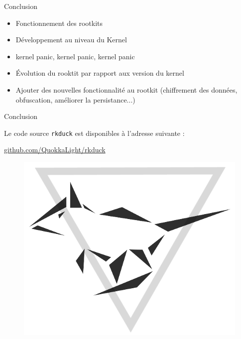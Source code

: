 \documentclass[10pt]{beamer}
\begin{document}
\begin{frame}{Conclusion}
	
	\begin{itemize}
		\item Fonctionnement des rootkits
		\item Développement au niveau du Kernel
		\item kernel panic, kernel panic, kernel panic
		\item Évolution du rooktit par rapport aux version du kernel
		\item Ajouter des nouvelles fonctionnalité au rootkit (chiffrement des données, obfuscation, améliorer la persistance...)
		
	\end{itemize}

\end{frame}

\begin{frame}{Conclusion}

  \begin{center}Le code source \texttt{rkduck} est disponibles à l'adresse suivante : \end{center}

  \begin{center}\url{github.com/QuokkaLight/rkduck}\end{center}
  
  \begin{figure}
	\begin{center}
	\includegraphics[scale=0.3]{logo_blk.png}
	\end{center}
  \end{figure}

\end{frame}
\end{document}
